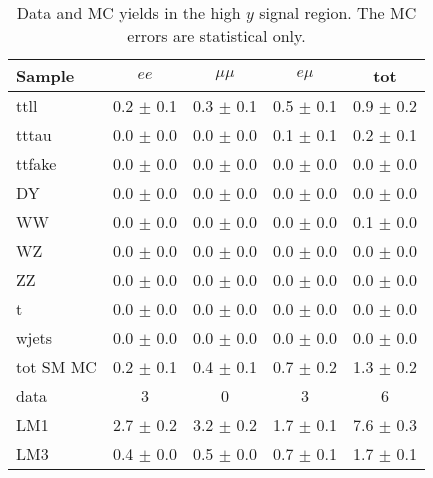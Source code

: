 \begin{table}[hbt]
\begin{center}
\caption{\label{tab:sigyield2} Data and MC yields in the high $y$ signal region.
The MC errors are statistical only.}
\begin{tabular}{l|cccc}
\hline
         Sample   &           $ee$   &       $\mu\mu$   &         $e\mu$   &            tot  \\
\hline
           ttll   &  0.2 $\pm$ 0.1   &  0.3 $\pm$ 0.1   &  0.5 $\pm$ 0.1   &  0.9 $\pm$ 0.2  \\
          tttau   &  0.0 $\pm$ 0.0   &  0.0 $\pm$ 0.0   &  0.1 $\pm$ 0.1   &  0.2 $\pm$ 0.1  \\
         ttfake   &  0.0 $\pm$ 0.0   &  0.0 $\pm$ 0.0   &  0.0 $\pm$ 0.0   &  0.0 $\pm$ 0.0  \\
             DY   &  0.0 $\pm$ 0.0   &  0.0 $\pm$ 0.0   &  0.0 $\pm$ 0.0   &  0.0 $\pm$ 0.0  \\
             WW   &  0.0 $\pm$ 0.0   &  0.0 $\pm$ 0.0   &  0.0 $\pm$ 0.0   &  0.1 $\pm$ 0.0  \\
             WZ   &  0.0 $\pm$ 0.0   &  0.0 $\pm$ 0.0   &  0.0 $\pm$ 0.0   &  0.0 $\pm$ 0.0  \\
             ZZ   &  0.0 $\pm$ 0.0   &  0.0 $\pm$ 0.0   &  0.0 $\pm$ 0.0   &  0.0 $\pm$ 0.0  \\
              t   &  0.0 $\pm$ 0.0   &  0.0 $\pm$ 0.0   &  0.0 $\pm$ 0.0   &  0.0 $\pm$ 0.0  \\
          wjets   &  0.0 $\pm$ 0.0   &  0.0 $\pm$ 0.0   &  0.0 $\pm$ 0.0   &  0.0 $\pm$ 0.0  \\
\hline
      tot SM MC   &  0.2 $\pm$ 0.1   &  0.4 $\pm$ 0.1   &  0.7 $\pm$ 0.2   &  1.3 $\pm$ 0.2  \\
\hline
           data   &              3   &              0   &              3   &              6  \\
\hline
            LM1   &  2.7 $\pm$ 0.2   &  3.2 $\pm$ 0.2   &  1.7 $\pm$ 0.1   &  7.6 $\pm$ 0.3  \\
            LM3   &  0.4 $\pm$ 0.0   &  0.5 $\pm$ 0.0   &  0.7 $\pm$ 0.1   &  1.7 $\pm$ 0.1  \\
\hline
\end{tabular}
\end{center}
\end{table}

